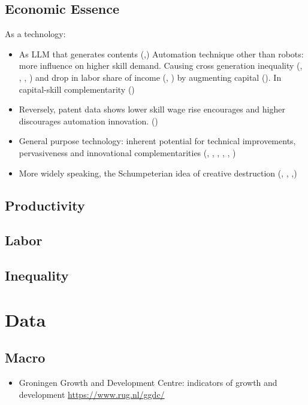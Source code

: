 \documentclass[10pt]{article} %
\begin{document}
    \subsection{Economic Essence}
    As a technology:
    \begin{itemize}
        \item As LLM that generates contents (\cite{Feltenetal2023},\cite{Eloundouetal2023})
        Automation technique other than robots: more influence on higher skill demand. Causing cross generation inequality (\cite{KatzMurphy1992}, \cite{SachsKotlikoff2012}, \cite{HemousOlsen2022}, \cite{AcemogluRestrepo2018}) and drop in labor share of income (\cite{MookherjeeRay2022}, \cite{ShimizuMomoda2023}) by augmenting capital (\cite{Zhang2023}). In capital-skill complementarity (\cite{OhanianOrakShen2023})
        \item Reversely, patent data shows lower skill wage rise encourages and higher discourages automation innovation. (\cite{Hemousetal2019})
        \item General purpose technology: inherent potential for technical improvements, pervasiveness and innovational complementarities (\cite{BRESNAHANTrajtenberg1995}, \cite{Agrawaletal2019}, \cite{Agrawaletal2023}, \cite{GOLDFARBTaskaTeodoridis2023}, \cite{Bresnahan2023}, \cite{Eloundouetal2023})
        \item More widely speaking, the Schumpeterian idea of creative destruction (\cite{Acemoglu1998}, \cite{Acemoglu2002}, \cite{AghionAkcigitHyytinenToivanen2018},)
        
    \end{itemize}
    \subsection{Productivity}
    \subsection{Labor}
    \subsection{Inequality}

\newpage
\section{Data}
    \subsection{Macro}
        \begin{itemize}
            \item Groningen Growth and Development Centre: indicators of growth and development \url{https://www.rug.nl/ggdc/}
        \end{itemize}
\end{document}
